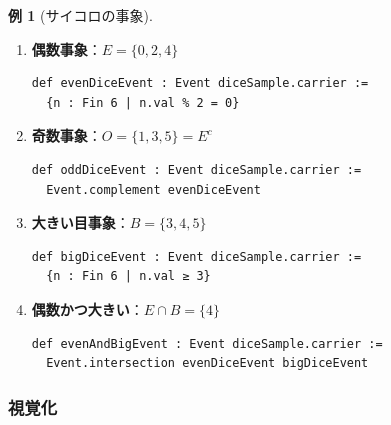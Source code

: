 \documentclass[12pt,a4paper,ja=standard]{bxjsarticle}
\theoremstyle{definition}
\newtheorem{example}[definition]{例}
\begin{document}
\begin{example}[サイコロの事象]
\begin{enumerate}
    \item \textbf{偶数事象}：$E = \{0, 2, 4\}$
    \begin{verbatim}
def evenDiceEvent : Event diceSample.carrier :=
  {n : Fin 6 | n.val % 2 = 0}
    \end{verbatim}
    
    \item \textbf{奇数事象}：$O = \{1, 3, 5\} = E^c$
    \begin{verbatim}
def oddDiceEvent : Event diceSample.carrier :=
  Event.complement evenDiceEvent
    \end{verbatim}
    
    \item \textbf{大きい目事象}：$B = \{3, 4, 5\}$
    \begin{verbatim}
def bigDiceEvent : Event diceSample.carrier :=
  {n : Fin 6 | n.val ≥ 3}
    \end{verbatim}
    
    \item \textbf{偶数かつ大きい}：$E \cap B = \{4\}$
    \begin{verbatim}
def evenAndBigEvent : Event diceSample.carrier :=
  Event.intersection evenDiceEvent bigDiceEvent
    \end{verbatim}
\end{enumerate}
\end{example}

\subsubsection{視覚化}

\begin{center}
\end{center}
\end{document}
